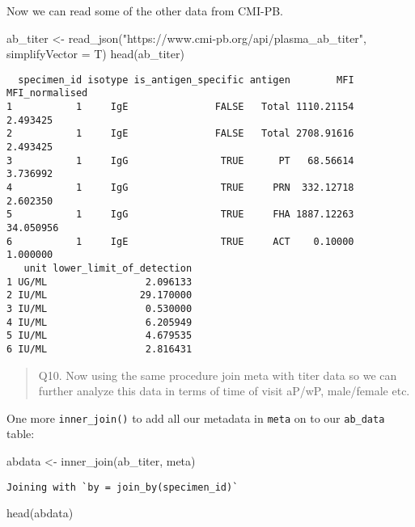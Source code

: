 \documentclass[
  letterpaper,
  DIV=11,
  numbers=noendperiod]{scrartcl}
\newenvironment{Shaded}{\begin{snugshade}}{\end{snugshade}}
\newcommand{\AttributeTok}[1]{\textcolor[rgb]{0.40,0.45,0.13}{#1}}
\newcommand{\FunctionTok}[1]{\textcolor[rgb]{0.28,0.35,0.67}{#1}}
\newcommand{\NormalTok}[1]{\textcolor[rgb]{0.00,0.23,0.31}{#1}}
\newcommand{\OtherTok}[1]{\textcolor[rgb]{0.00,0.23,0.31}{#1}}
\newcommand{\StringTok}[1]{\textcolor[rgb]{0.13,0.47,0.30}{#1}}
\begin{document}
Now we can read some of the other data from CMI-PB.

\begin{Shaded}
\begin{Highlighting}[]
\NormalTok{ab\_titer }\OtherTok{\textless{}{-}} \FunctionTok{read\_json}\NormalTok{(}\StringTok{"https://www.cmi{-}pb.org/api/plasma\_ab\_titer"}\NormalTok{, }\AttributeTok{simplifyVector =}\NormalTok{ T)}
\FunctionTok{head}\NormalTok{(ab\_titer)}
\end{Highlighting}
\end{Shaded}

\begin{verbatim}
  specimen_id isotype is_antigen_specific antigen        MFI MFI_normalised
1           1     IgE               FALSE   Total 1110.21154       2.493425
2           1     IgE               FALSE   Total 2708.91616       2.493425
3           1     IgG                TRUE      PT   68.56614       3.736992
4           1     IgG                TRUE     PRN  332.12718       2.602350
5           1     IgG                TRUE     FHA 1887.12263      34.050956
6           1     IgE                TRUE     ACT    0.10000       1.000000
   unit lower_limit_of_detection
1 UG/ML                 2.096133
2 IU/ML                29.170000
3 IU/ML                 0.530000
4 IU/ML                 6.205949
5 IU/ML                 4.679535
6 IU/ML                 2.816431
\end{verbatim}

\begin{quote}
Q10. Now using the same procedure join meta with titer data so we can
further analyze this data in terms of time of visit aP/wP, male/female
etc.
\end{quote}

One more \texttt{inner\_join()} to add all our metadata in \texttt{meta}
on to our \texttt{ab\_data} table:

\begin{Shaded}
\begin{Highlighting}[]
\NormalTok{abdata }\OtherTok{\textless{}{-}} \FunctionTok{inner\_join}\NormalTok{(ab\_titer, meta)}
\end{Highlighting}
\end{Shaded}

\begin{verbatim}
Joining with `by = join_by(specimen_id)`
\end{verbatim}

\begin{Shaded}
\begin{Highlighting}[]
\FunctionTok{head}\NormalTok{(abdata)}
\end{Highlighting}
\end{Shaded}
\end{document}
